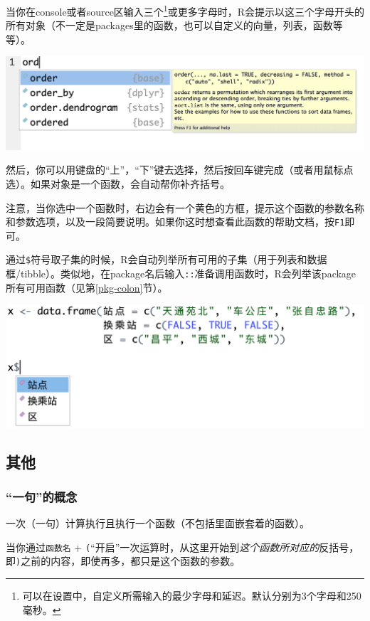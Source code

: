 \documentclass[]{book}
\let\rmarkdownfootnote\footnote%
\def\footnote{\protect\rmarkdownfootnote}
\begin{document}
当你在console或者source区输入三个\footnote{可以在设置中，自定义所需输入的最少字母和延迟。默认分别为3个字母和250毫秒。}或更多字母时，R会提示以这三个字母开头的所有对象（不一定是packages里的函数，也可以自定义的向量，列表，函数等等）。

\includegraphics[width=26.28in]{img/rstudio-fuli/auto}

然后，你可以用键盘的``上''，``下''键去选择，然后按回车键完成（或者用鼠标点选）。如果对象是一个函数，会自动帮你补齐括号。

注意，当你选中一个函数时，右边会有一个黄色的方框，提示这个函数的参数名称和参数选项，以及一段简要说明。如果你这时想查看此函数的帮助文档，按\texttt{F1}即可。

通过\texttt{\$}符号取子集的时候，R会自动列举所有可用的子集（用于列表和数据框/tibble）。类似地，在package名后输入\texttt{::}准备调用函数时，R会列举该package所有可用函数（见第\ref{pkg-colon}节）。

\includegraphics[width=35.42in]{img/rstudio-fuli/auto-sub}

\hypertarget{misc}{%
\subsection{其他}\label{misc}}

\subsubsection{``一句''的概念}

一次（一句）计算执行且执行一个函数（不包括里面嵌套着的函数）。

当你通过\texttt{函数名} + \texttt{(}``开启''一次运算时，从这里开始到\emph{这个函数所对应的}反括号，即\texttt{)}之前的内容，即使再多，都只是这个函数的参数。
\end{document}
